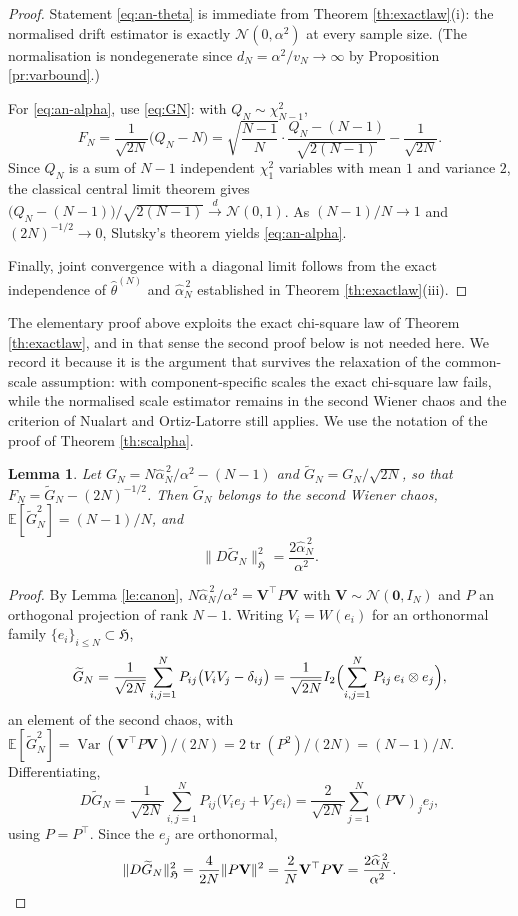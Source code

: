 \documentclass[11pt,reqno]{amsart}
\numberwithin{equation}{section}
\theoremstyle{plain}
\newtheorem{lemma}[theorem]{Lemma}
\theoremstyle{definition}
\theoremstyle{remark}
\newcommand{\bV}{\mathbf{V}}
\newcommand{\bze}{\mathbf{0}}
\newcommand{\E}{\mathbb{E}}
\newcommand{\Norm}{\mathcal{N}}
\newcommand{\Hi}{\mathfrak{H}}
\DeclareMathOperator{\Var}{Var}
\DeclareMathOperator{\tr}{tr}
\begin{document}
\begin{proof}
Statement \eqref{eq:an-theta} is immediate from Theorem \ref{th:exactlaw}(i): the
normalised drift estimator is exactly $\Norm(0,\alpha^{2})$ at every sample size. (The
normalisation is nondegenerate since $d_N=\alpha^{2}/v_N\to\infty$ by
Proposition \ref{pr:varbound}.)

For \eqref{eq:an-alpha}, use \eqref{eq:GN}: with $Q_N\sim\chi^{2}_{N-1}$,
\[
  F_N=\frac{1}{\sqrt{2N}}\bigl(Q_N-N\bigr)
  =\sqrt{\frac{N-1}{N}}\cdot\frac{Q_N-(N-1)}{\sqrt{2(N-1)}}-\frac{1}{\sqrt{2N}} .
\]
Since $Q_N$ is a sum of $N-1$ independent $\chi^{2}_{1}$ variables with mean $1$ and
variance $2$, the classical central limit theorem gives
$\bigl(Q_N-(N-1)\bigr)/\sqrt{2(N-1)}\xrightarrow{d}\Norm(0,1)$. As $(N-1)/N\to1$ and
$(2N)^{-1/2}\to0$, Slutsky's theorem yields \eqref{eq:an-alpha}.

Finally, joint convergence with a diagonal limit follows from the exact independence of
$\widehat\theta^{(N)}$ and $\widehat\alpha^{\,2}_N$ established in Theorem
\ref{th:exactlaw}(iii).
\end{proof}

The elementary proof above exploits the exact chi-square law of Theorem
\ref{th:exactlaw}, and in that sense the second proof below is not needed here. We record
it because it is the argument that survives the relaxation of the common-scale
assumption: with component-specific scales the exact chi-square law fails, while the
normalised scale estimator remains in the second Wiener chaos and the criterion of
Nualart and Ortiz-Latorre \cite{NOL08} still applies. We use the
notation of the proof of Theorem \ref{th:scalpha}.

\begin{lemma}\label{le:malliavin}
Let $G_N=N\widehat\alpha^{\,2}_N/\alpha^{2}-(N-1)$ and
$\widetilde G_N=G_N/\sqrt{2N}$, so that $F_N=\widetilde G_N-(2N)^{-1/2}$. Then
$\widetilde G_N$ belongs to the second Wiener chaos,
$\E[\widetilde G_N^{2}]=(N-1)/N$, and
\begin{equation}\label{eq:mall}
  \bigl\|D\widetilde G_N\bigr\|_{\Hi}^{2}=\frac{2\widehat\alpha^{\,2}_N}{\alpha^{2}} .
\end{equation}
\end{lemma}

\begin{proof}
By Lemma \ref{le:canon}, $N\widehat\alpha^{\,2}_N/\alpha^{2}=\bV^{\top}P\bV$ with
$\bV\sim\Norm(\bze,I_N)$ and $P$ an orthogonal projection of rank $N-1$. Writing
$V_i=W(e_i)$ for an orthonormal family $\{e_i\}_{i\le N}\subset\Hi$,
\[
  \widetilde G_N=\frac{1}{\sqrt{2N}}\sum_{i,j=1}^{N}P_{ij}\bigl(V_iV_j-\delta_{ij}\bigr)
  =\frac{1}{\sqrt{2N}}I_2\Bigl(\sum_{i,j=1}^{N}P_{ij}\,e_i\otimes e_j\Bigr),
\]
an element of the second chaos, with
$\E[\widetilde G_N^{2}]=\Var(\bV^{\top}P\bV)/(2N)=2\tr(P^{2})/(2N)=(N-1)/N$.
Differentiating,
\[
  D\widetilde G_N=\frac{1}{\sqrt{2N}}\sum_{i,j=1}^{N}P_{ij}\bigl(V_ie_j+V_je_i\bigr)
  =\frac{2}{\sqrt{2N}}\sum_{j=1}^{N}(P\bV)_je_j,
\]
using $P=P^{\top}$. Since the $e_j$ are orthonormal,
\[
  \|D\widetilde G_N\|^{2}_{\Hi}=\frac{4}{2N}\|P\bV\|^{2}
  =\frac2N\bV^{\top}P\bV=\frac{2\widehat\alpha^{\,2}_N}{\alpha^{2}} . \qedhere
\]
\end{proof}
\end{document}
